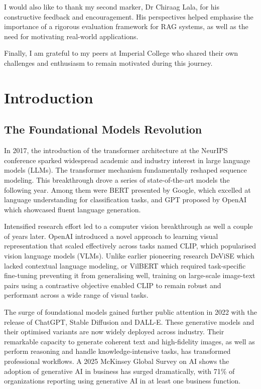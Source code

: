 \documentclass[12pt,twoside]{report}
\begin{document}
I would also like to thank my second marker, Dr Chiraag Lala, for his constructive feedback and encouragement. His perspectives helped emphasise the importance of a rigorous evaluation framework for RAG systems, as well as the need for motivating real-world applications.

Finally, I am grateful to my peers at Imperial College who shared their own challenges and enthusiasm to remain motivated during this journey.


\cleardoublepage
{}
\tablecontents 

\cleardoublepage
{}
\setcounter{page}{1}

\chapter{Introduction}

\section{The Foundational Models Revolution}
In 2017, the introduction of the transformer architecture\cite{AttentionIsAllYouNeed} at the NeurIPS conference sparked widespread academic and industry interest in large language models (LLMs). The transformer mechanism fundamentally reshaped sequence modeling. This breakthrough drove a series of state-of-the-art models the following year. Among them were BERT\cite{BERT} presented by Google, which excelled at language understanding for classification tasks, and GPT\cite{GPT} proposed by OpenAI which showcased fluent language generation.

Intensified research effort led to a computer vision breakthrough as well a couple of years later. OpenAI introduced a novel approach to learning visual representation that scaled effectively across tasks named CLIP\cite{CLIP}, which popularised vision language models (VLMs). Unlike earlier pioneering research DeViSE\cite{DeViSE} which lacked contextual language modeling, or VilBERT\cite{ViLBERT} which required task-specific fine-tuning preventing it from generalising well, training on large-scale image-text pairs using a contrastive objective enabled CLIP to remain robust and performant across a wide range of visual tasks.

The surge of foundational models\cite{FoundationModels} gained further public attention in 2022 with the release of ChatGPT\cite{IntroducingChatGPT}, Stable Diffusion\cite{StableDiffusion} and DALL-E\cite{DALL-E-2}. These generative models and their optimised variants are now widely deployed across industry. Their remarkable capacity to generate coherent text and high-fidelity images, as well as perform reasoning and handle knowledge-intensive tasks, has transformed professional workflows\cite{FoundationModelsInBigBusiness}. A 2025 McKinsey Global Survey on AI shows the adoption of generative AI in business has surged dramatically, with 71\% of organizations reporting using generative AI in at least one business function.
\end{document}
